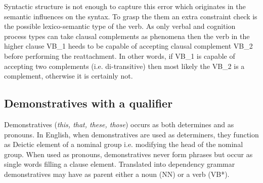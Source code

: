 Syntactic structure is not enough to capture this error which originates in the semantic influences on the syntax. To grasp the them an extra constraint check is the possible lexico-semantic type of the verb. As only verbal and cognition process types can take clausal complements as phenomena then the verb in the higher clause VB_1 heeds to be capable of accepting clausal complement VB_2 before performing the reattachment. In other words, if VB_1 is capable of accepting two complements (i.e. di-transitive) then most likely the VB_2 is a complement, otherwise it is certainly not.



\subsection{Demonstratives with a qualifier}
%     
Demonstratives (\textit{this, that, these, those}) occurs as both determines and as pronouns. In English, when demonstratives are used as determiners, they function as Deictic element of a nominal group i.e. modifying the head of the nominal group. When used as pronouns, demonstratives never form phrases but occur as single words filling a clause element. Translated into dependency grammar demonstratives may have as parent either a noun (NN) or a verb (VB*). 

